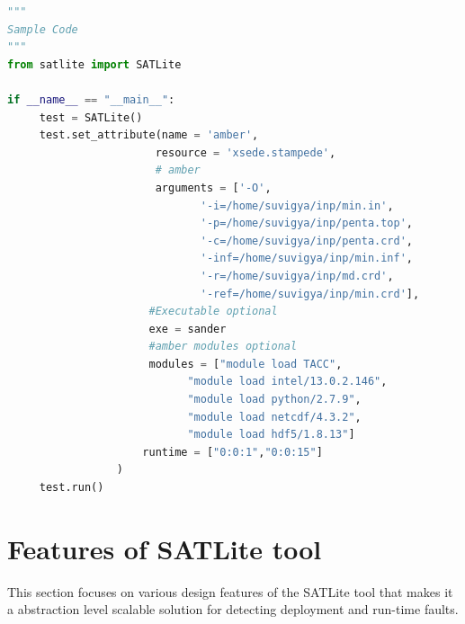 \documentclass[10pt]{ruthesis}
\begin{document}
\begin{lstlisting}[language=Python, linewidth=16cm]
"""
Sample Code
"""
from satlite import SATLite

if __name__ == "__main__":
     test = SATLite()
     test.set_attribute(name = 'amber',
                       resource = 'xsede.stampede',
                       # amber
                       arguments = ['-O',
                              '-i=/home/suvigya/inp/min.in',
                              '-p=/home/suvigya/inp/penta.top',
                              '-c=/home/suvigya/inp/penta.crd',
                              '-inf=/home/suvigya/inp/min.inf',
                              '-r=/home/suvigya/inp/md.crd',
                              '-ref=/home/suvigya/inp/min.crd'],
                      #Executable optional
                      exe = sander
                      #amber modules optional
                      modules = ["module load TACC",
                            "module load intel/13.0.2.146",
                            "module load python/2.7.9",
                            "module load netcdf/4.3.2",
                            "module load hdf5/1.8.13"]
                     runtime = ["0:0:1","0:0:15"]
                 )
     test.run()
\end{lstlisting}

\section{Features of SATLite tool}
This section focuses on various design features of the SATLite tool that makes it a abstraction level scalable solution for detecting deployment and run-time faults.
\end{document}
